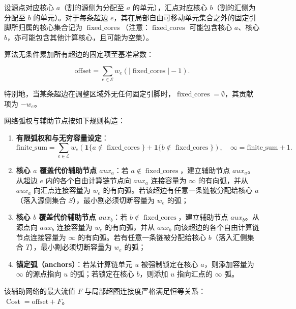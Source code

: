 \documentclass[anonymous,notoc]{gmcm2026}
\providecommand{\tightlist}{\setlength{\itemsep}{0pt}\setlength{\parskip}{0pt}}
\begin{document}
设源点对应核心 \(a\)（割的源侧为分配至 \(a\) 的单元），汇点对应核心 \(b\)（割的汇侧为分配至 \(b\) 的单元）。对于每条超边 \(e\)，其在局部自由可移动单元集合之外的固定引脚所归属的核心集合记为 \(\operatorname{fixed\_cores}\)（注意：\(\operatorname{fixed\_cores}\) 可能包含核心 \(a\)、核心 \(b\)，亦可能包含其他计算核心，且可能为空集）。

算法无条件累加所有超边的固定项至基准常数：

\begin{equation}
\text{offset} = \sum_{e \in \mathcal{E}} w_e (|\operatorname{fixed\_cores}| - 1).
\end{equation}

特别地，当某条超边在调整区域外无任何固定引脚时，\(\operatorname{fixed\_cores} = \emptyset\)，其贡献项为 \(-w_e\)。

网络弧权与辅助节点按如下规则构造：

\begin{enumerate}
\def\labelenumi{\arabic{enumi}.}
\tightlist
\item
  \textbf{有限弧权和与无穷容量设定}： \begin{equation}
\text{finite\_sum} = \sum_{e \in \mathcal{E}} w_e \left( \mathbf{1}\{a \notin \operatorname{fixed\_cores}\} + \mathbf{1}\{b \notin \operatorname{fixed\_cores}\} \right), \quad \infty = \text{finite\_sum} + 1.
\end{equation}
\item
  \textbf{核心 \(a\) 覆盖代价辅助节点 \(aux_a\)}：若 \(a \notin \operatorname{fixed\_cores}\)，建立辅助节点 \(aux_a\)。从超边 \(e\) 内的各个自由计算链节点向 \(aux_a\) 连接容量为 \(\infty\) 的有向弧，并从 \(aux_a\) 向汇点连接容量为 \(w_e\) 的有向弧。若该超边有任意一条链被分配给核心 \(a\)（落入源侧集合 \(S\)），最小割必须切断容量为 \(w_e\) 的弧；
\item
  \textbf{核心 \(b\) 覆盖代价辅助节点 \(aux_b\)}：若 \(b \notin \operatorname{fixed\_cores}\)，建立辅助节点 \(aux_b\)。从源点向 \(aux_b\) 连接容量为 \(w_e\) 的有向弧，并从 \(aux_b\) 向该超边的各个自由计算链节点连接容量为 \(\infty\) 的有向弧。若有任意一条链被分配给核心 \(b\)（落入汇侧集合 \(T\)），最小割必须切断容量为 \(w_e\) 的弧；
\item
  \textbf{锚定弧（anchors）}：若某计算链单元 \(u\) 被强制锁定在核心 \(a\)，则添加容量为 \(\infty\) 的源点指向 \(u\) 的弧；若锁定在核心 \(b\)，则添加 \(u\) 指向汇点的 \(\infty\) 弧。
\end{enumerate}

该辅助网络的最大流值 \(F\) 与局部超图连接度严格满足恒等关系：\(\operatorname{Cost} = \text{offset} + F\)。
\end{document}
